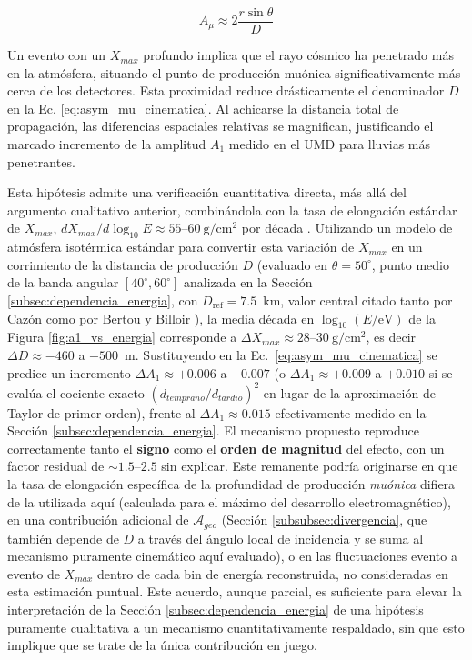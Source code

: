 \begin{equation}
	A_{\mu} \approx 2 \frac{r \sin\theta}{D}
	\label{eq:asym_mu_cinematica}
\end{equation}

Un evento con un $X_{max}$ profundo implica que el rayo cósmico ha penetrado más en la atmósfera, situando el punto de producción muónica significativamente más cerca de los detectores. Esta proximidad reduce drásticamente el denominador $D$ en la Ec. \ref{eq:asym_mu_cinematica}. Al achicarse la distancia total de propagación, las diferencias espaciales relativas se magnifican, justificando el marcado incremento de la amplitud $A_1$ medido en el UMD para lluvias más penetrantes.

Esta hipótesis admite una verificación cuantitativa directa, más allá del argumento cualitativo anterior, combinándola con la tasa de elongación estándar de $X_{max}$, $dX_{max}/d\log_{10}E \approx 55$–$60~\mathrm{g/cm^2}$ por década \cite{yushkov2019mass}. Utilizando un modelo de atmósfera isotérmica estándar para convertir esta variación de $X_{max}$ en un corrimiento de la distancia de producción $D$ (evaluado en $\theta = 50^\circ$, punto medio de la banda angular $[40^\circ,60^\circ]$ analizada en la Sección \ref{subsec:dependencia_energia}, con $D_{\mathrm{ref}} = 7.5$~km, valor central citado tanto por Cazón \cite{Cazon2012} como por Bertou y Billoir \cite{GAP2000_017}), la media década en $\log_{10}(E/\mathrm{eV})$ de la Figura \ref{fig:a1_vs_energia} corresponde a $\Delta X_{max} \approx 28$–$30~\mathrm{g/cm^2}$, es decir $\Delta D \approx -460$ a $-500$~m. Sustituyendo en la Ec.~\ref{eq:asym_mu_cinematica} se predice un incremento $\Delta A_1 \approx +0.006$ a $+0.007$ (o $\Delta A_1 \approx +0.009$ a $+0.010$ si se evalúa el cociente exacto $(d_{temprano}/d_{tardio})^2$ en lugar de la aproximación de Taylor de primer orden), frente al $\Delta A_1 \approx 0.015$ efectivamente medido en la Sección \ref{subsec:dependencia_energia}. El mecanismo propuesto reproduce correctamente tanto el \textbf{signo} como el \textbf{orden de magnitud} del efecto, con un factor residual de $\sim 1.5$–$2.5$ sin explicar. Este remanente podría originarse en que la tasa de elongación específica de la profundidad de producción \textit{muónica} difiera de la utilizada aquí (calculada para el máximo del desarrollo electromagnético), en una contribución adicional de $\mathcal{A}_{geo}$ (Sección \ref{subsubsec:divergencia}, que también depende de $D$ a través del ángulo local de incidencia y se suma al mecanismo puramente cinemático aquí evaluado), o en las fluctuaciones evento a evento de $X_{max}$ dentro de cada bin de energía reconstruida, no consideradas en esta estimación puntual. Este acuerdo, aunque parcial, es suficiente para elevar la interpretación de la Sección \ref{subsec:dependencia_energia} de una hipótesis puramente cualitativa a un mecanismo cuantitativamente respaldado, sin que esto implique que se trate de la única contribución en juego.


